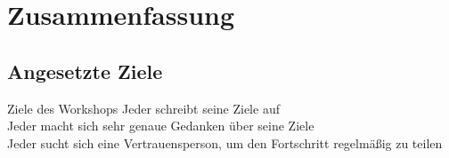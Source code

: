 \section{Zusammenfassung}

\subsection{Angesetzte Ziele}


\begin{frame}[c]{Ziele des Workshops}
    \Large
     \cmb Jeder schreibt seine Ziele auf \\
     \cmb Jeder macht sich sehr genaue Gedanken über seine Ziele \\
     \cmb Jeder sucht sich eine Vertrauensperson, um den Fortschritt regelmäßig zu teilen \\
\end{frame}
